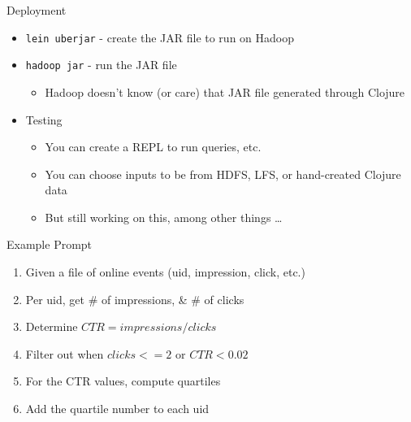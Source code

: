 \documentclass{beamer}
\begin{document}
\begin{frame}{Deployment}
  \begin{itemize}
  \item \texttt{lein uberjar} - create the JAR file to run on Hadoop
  \item \texttt{hadoop jar} - run the JAR file
    \begin{itemize}
    \item Hadoop doesn't know (or care) that JAR file generated
      through Clojure
    \end{itemize}
  \item Testing
    \begin{itemize}
    \item You can create a REPL to run queries, etc.
    \item You can choose inputs to be from HDFS, LFS, or hand-created
      Clojure data
    \item But still working on this, among other things \ldots
    \end{itemize}
  \end{itemize}
\end{frame}


\begin{frame}{Example Prompt}
  \begin{enumerate}
  \item Given a file of online events (uid, impression, click, etc.)
  \item Per uid, get \# of impressions, \& \# of clicks
  \item Determine $CTR = impressions / clicks$
  \item Filter out when $clicks <= 2$ or $CTR < 0.02$
  \item For the CTR values, compute quartiles
  \item Add the quartile number to each uid
  \end{enumerate}
\end{frame}
\end{document}

